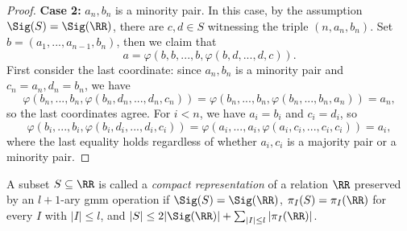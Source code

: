 \begin{proof}
{\bf Case 2: }$a_n,b_n$ is a minority pair. In this case, by the assumption $\Sig(S) = \Sig(\RR)$, there are $c,d \in S$ witnessing the triple $(n,a_n,b_n)$. Set $b = (a_1, ..., a_{n-1}, b_n)$, then we claim that
\[
a = \varphi(b,b,...,b,\varphi(b,d,...,d,c)).
\]
First consider the last coordinate: since $a_n,b_n$ is a minority pair and $c_n = a_n, d_n = b_n$, we have
\[
\varphi(b_n, ..., b_n,\varphi(b_n,d_n,...,d_n,c_n)) = \varphi(b_n, ..., b_n, \varphi(b_n, ..., b_n, a_n)) = a_n,
\]
so the last coordinates agree. For $i < n$, we have $a_i = b_i$ and $c_i = d_i$, so
\[
\varphi(b_i, ..., b_i,\varphi(b_i,d_i,...,d_i,c_i)) = \varphi(a_i, ..., a_i,\varphi(a_i,c_i,...,c_i,c_i)) = a_i,
\]
where the last equality holds regardless of whether $a_i,c_i$ is a majority pair or a minority pair.
\end{proof}

\begin{defn} A subset $S \subseteq \RR$ is called a \emph{compact representation} of a relation $\RR$ preserved by an $l+1$-ary gmm operation if $\Sig(S) = \Sig(\RR)$, $\pi_I(S) = \pi_I(\RR)$ for every $I$ with $|I| \le l$, and $|S| \le 2|\Sig(\RR)| + \sum_{|I| \le l} |\pi_I(\RR)|$.
\end{defn}

